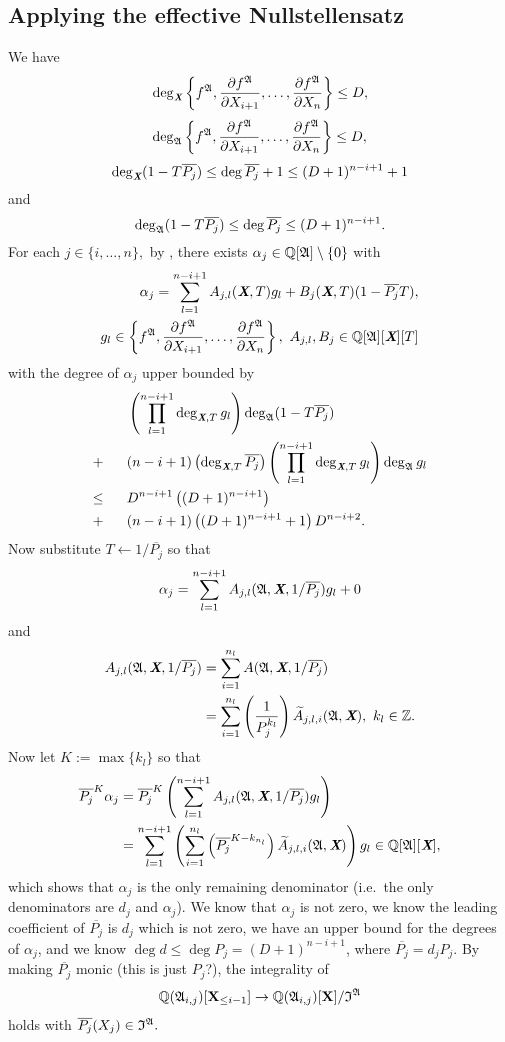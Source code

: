 \documentclass[sigconf]{acmart}
\def\Xb{\textit{\textbf{X}}}
\def\pjb{\overline{P_{j}}}
\def\Q{\mathbb{Q}}
\def\At{\widetilde{A}}
\def\I{\frak{I}}
\def\A{\frak{A}}
\begin{document}
\subsection{Applying the effective Nullstellensatz}
%
We have
\[
\deg_{\Xb}\left\{ 
f^\A,\frac{\partial f^\A}{\partial X_{i+1}},\hdots,\frac{\partial f^\A}{\partial X_n}
\right\}\leq D,
\]
\[
\deg_{\A}  
\left\{ 
f^\A,\frac{\partial f^\A}{\partial X_{i+1}},\hdots,\frac{\partial f^\A}{\partial X_n}
\right\} \leq D,
\]
\[
\deg_{\Xb}(1-T\pjb) \leq \deg \pjb +1 \leq (D+1)^{n-i+1}+1
\]
and
\[
\deg_{\A}(1-T\pjb) \leq \deg \pjb\leq (D+1)^{n-i+1}.
\]
For each $j \in \{i,\hdots,n\},$ by \cite[Theorem 0.5]{EN}, there exists $\alpha_j \in \mathbb{Q}[\A]\setminus\{0\}$ with 
%
\begin{align*}
\alpha_j = \sum_{l=1}^{n-i+1} A_{j,l}(\textit{\textbf{X}},T)g_l + B_j(\textit{\textbf{X}},T)(1-\pjb T), \\ g_l \in 
\left\{ 
f^\A,\frac{\partial f^\A}{\partial X_{i+1}},\hdots,\frac{\partial f^\A}{\partial X_n}
\right\},~ A_{j,l},B_j \in \mathbb{Q}[\A][\Xb][T]
\end{align*}
%
with the degree of $\alpha_j$ upper bounded by
%
\begin{align*}
    &\left(\prod_{l=1}^{n-i+1} \deg_{\Xb,T} g_l\right)\deg_{\A} (1-T\pjb)\\ 
    + ~~~~~&(n-i+1)\left(\deg_{\Xb,T}\pjb\right)\left(\prod_{l=1}^{n-i+1}\deg_{\Xb,T} g_l \right)\deg_{\A} g_l\\
    \leq ~~~~~&D^{n-i+1}\left( (D+1)^{n-i+1}\right)\\
    +~~~~~&(n-i+1)\left( (D+1)^{n-i+1}+1\right)D^{n-i+2}.
\end{align*}
%
Now substitute $T \leftarrow 1/\pjb$ so that 
\[
\alpha_j = \sum_{l=1}^{n-i+1} A_{j,l}(\A,\textit{\textbf{X}},1/\pjb)g_l + 0
\]
and
%
\begin{align*}
A_{j,l}(\A,\textit{\textbf{X}},1/\pjb) 
&= \sum_{i=1}^{n_l} A(\A,\Xb,1/\pjb)\\
&= \sum_{i=1}^{n_l} \left(\frac{1}{P_j^{k_l}}\right)\At_{j,l,i}(\A,\textit{\textbf{X}}), ~k_l \in \mathbb{Z}.
\end{align*}
%
Now let $K := \max\{k_l\}$ so that 
%
\begin{align*}
    \pjb^K \alpha_j &= \pjb^K\left(\sum_{l=1}^{n-i+1} A_{j,l}(\A,\textit{\textbf{X}},1/\pjb)g_l\right)\\
    &= \sum_{l=1}^{n-i+1}\left( \sum_{i=1}^{n_l}\left(\pjb^{K-k_{n_l}}\right)\At_{j,l,i}(\A,\Xb) \right)g_l \in \Q[\A][\Xb],
\end{align*}
%
which shows that $\alpha_j$ is the only remaining denominator (i.e.\ the only denominators are $d_j$ and $\alpha_j$). We know that $\alpha_j$ is not zero, we know the leading coefficient of $\overline{P_j}$ is $d_j$ which is not zero, we have an upper bound for the degrees of $\alpha_j$, and we know $\deg d \leq \deg P_j = (D+1)^{n-i+1}$, where $\pjb=d_jP_j.$ By making $\pjb$ monic (this is just $P_j$?), the integrality of 
%
\begin{align*}
\mathbb{Q}(\frak{A}_{i,j})[\textbf{X}_{\leq i-1}]\rightarrow\mathbb{Q}(\frak{A}_{i,j})[\textbf{X}]/\I^{\A}
\end{align*}
%
holds with $\pjb(X_j)\in \I^{\A}.$
%
\end{document}
